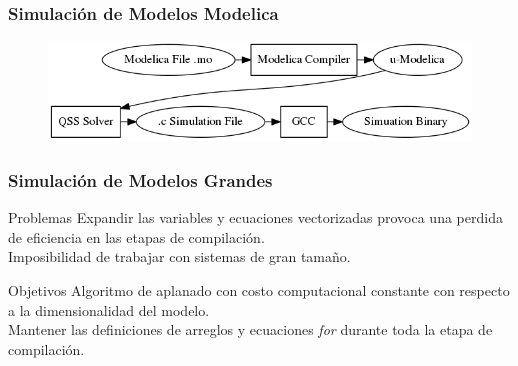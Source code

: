 \documentclass[aspectratio=169,10pt]{beamer}
\begin{document}
\begin{frame}[fragile]
\frametitle{Simulación de Modelos Modelica} 
    \begin{figure}
      \centering
      \includegraphics[scale=0.5]{Compilacion} 
      \label{fig:proceso}
    \end{figure}
\end{frame}



\begin{frame}[fragile]
\frametitle{Simulación de Modelos Grandes} 
\begin{block}{Problemas}
Expandir las variables y ecuaciones vectorizadas provoca una perdida de eficiencia en las etapas de compilación. \\
Imposibilidad de trabajar con sistemas de gran tamaño.
\end{block} 

\begin{block}{Objetivos}
Algoritmo de aplanado con costo computacional constante con respecto a la dimensionalidad del modelo. \\
Mantener las definiciones de arreglos y ecuaciones \textit{for} durante toda la etapa de compilación.
\end{block} 

\end{frame}



\end{document}
